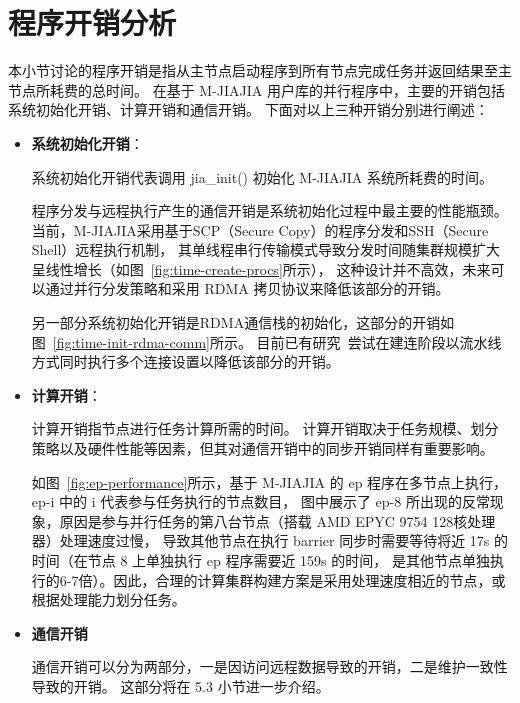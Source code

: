 {    \section{程序开销分析}
    本小节讨论的程序开销是指从主节点启动程序到所有节点完成任务并返回结果至主节点所耗费的总时间。
    在基于 M-JIAJIA 用户库的并行程序中，主要的开销包括系统初始化开销、计算开销和通信开销。
    下面对以上三种开销分别进行阐述：
    \begin{itemize}
        \item \textbf{系统初始化开销}：

              系统初始化开销代表调用 jia\_init() 初始化 M-JIAJIA 系统所耗费的时间。

              程序分发与远程执行产生的通信开销是系统初始化过程中最主要的性能瓶颈。
              当前，M-JIAJIA采用基于SCP（Secure Copy）的程序分发和SSH（Secure Shell）远程执行机制，
              其单线程串行传输模式导致分发时间随集群规模扩大呈线性增长（如图~\ref{fig:time-create-procs}所示），
              这种设计并不高效，未来可以通过并行分发策略和采用 RDMA 拷贝协议来降低该部分的开销。

              另一部分系统初始化开销是RDMA通信栈的初始化，这部分的开销如图~\ref{fig:time-init-rdma-comm}所示。
              目前已有研究~\citep{guo2024secm}尝试在建连阶段以流水线方式同时执行多个连接设置以降低该部分的开销。

        \item \textbf{计算开销}：

              计算开销指节点进行任务计算所需的时间。
              计算开销取决于任务规模、划分策略以及硬件性能等因素，但其对通信开销中的同步开销同样有重要影响。

              如图~\ref{fig:ep-performance}所示，基于 M-JIAJIA 的 ep 程序在多节点上执行，ep-i 中的 i 代表参与任务执行的节点数目，
              图中展示了 ep-8 所出现的反常现象，原因是参与并行任务的第八台节点（搭载 AMD EPYC 9754 128核处理器）处理速度过慢，
              导致其他节点在执行 barrier 同步时需要等待将近 17s 的时间（在节点 8 上单独执行 ep 程序需要近 159s 的时间，
              是其他节点单独执行的6-7倍）。因此，合理的计算集群构建方案是采用处理速度相近的节点，或根据处理能力划分任务。

        \item \textbf{通信开销}

              通信开销可以分为两部分，一是因访问远程数据导致的开销，二是维护一致性导致的开销。
              这部分将在 5.3 小节进一步介绍。

    \end{itemize}

}
